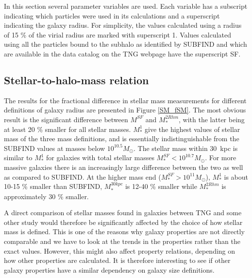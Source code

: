 In this section several parameter variables are used. Each variable has a subscript indicating which particles were used in its calculations and a superscript indicating the galaxy radius. For simplicity, the values calculated using a radius of 15 \% of the virial radius are marked with superscript 1. Values calculated using all the particles bound to the subhalo as identified by SUBFIND and which are available in the data catalog on the TNG webpage have the superscript SF.

\subsection{Stellar-to-halo-mass relation}

The results for the fractional difference in stellar mass measurements for different definitions of galaxy radius are presented in Figure \ref{SM_fSM}. The most obvious result is the significant difference between $M^{SF}$ and $M_\ast^{2Rhm}$, with the latter being at least 20 \% smaller for all stellar masses. $M_\ast^1$ give the highest values of stellar mass of the three mass definitions, and is essentially indistinguishable from the SUBFIND values at masses below $10^{10.5} M_{\odot}$. The stellar mass within 30$\,$ kpc is similar to $M^1_\ast$ for galaxies with total stellar masses $M^{SF}_\ast < 10^{10.7} M_{\odot}$. For more massive galaxies there is an increasingly large difference between the two as well as compared to SUBFIND. At the higher mass end ($M^{SF}_\ast > 10^{11} M_{\odot}$), $M^1_\ast$ is about 10-15 \% smaller than SUBFIND, $M_\ast^{30kpc}$ is 12-40 \% smaller while $M_\ast^{2Rhm}$ is approximately 30 \% smaller. 


A direct comparison of stellar masses found in galaxies between TNG and some other study would therefore be significantly affected by the choice of how stellar mass is defined. This is one of the reasons why galaxy properties are not directly comparable and we have to look at the trends in the properties rather than the exact values. However, this might also affect property relations, depending on how other properties are calculated. It is therefore interesting to see if other galaxy properties have a similar dependency on galaxy size definitions.

